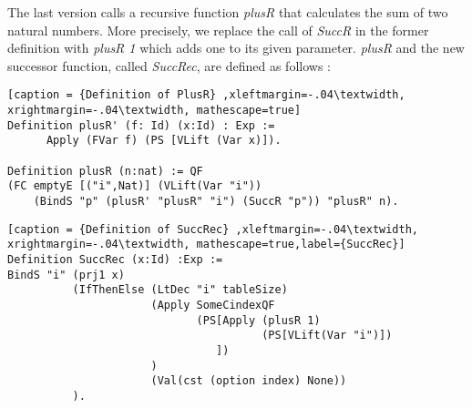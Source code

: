 The last version calls a recursive function \textit{plusR} that calculates the sum of two natural numbers. More precisely, we replace the call of \textit{SuccR} in the former definition with \textit{plusR 1} which adds one to its given parameter. \textit{plusR} and the new successor function, called \textit{SuccRec}, are defined as follows : \pagebreak
\begin{lstlisting}[caption = {Definition of PlusR} ,xleftmargin=-.04\textwidth,
xrightmargin=-.04\textwidth, mathescape=true]
Definition plusR' (f: Id) (x:Id) : Exp :=
      Apply (FVar f) (PS [VLift (Var x)]). 
      
Definition plusR (n:nat) := QF 
(FC emptyE [("i",Nat)] (VLift(Var "i")) 
    (BindS "p" (plusR' "plusR" "i") (SuccR "p")) "plusR" n).
\end{lstlisting}  
 
\begin{lstlisting}[caption = {Definition of SuccRec} ,xleftmargin=-.04\textwidth,
xrightmargin=-.04\textwidth, mathescape=true,label={SuccRec}]
Definition SuccRec (x:Id) :Exp :=
BindS "i" (prj1 x) 
          (IfThenElse (LtDec "i" tableSize) 
                      (Apply SomeCindexQF 
                             (PS[Apply (plusR 1) 
                                       (PS[VLift(Var "i")])
                                ])
                      ) 
                      (Val(cst (option index) None))
          ).
\end{lstlisting} 
